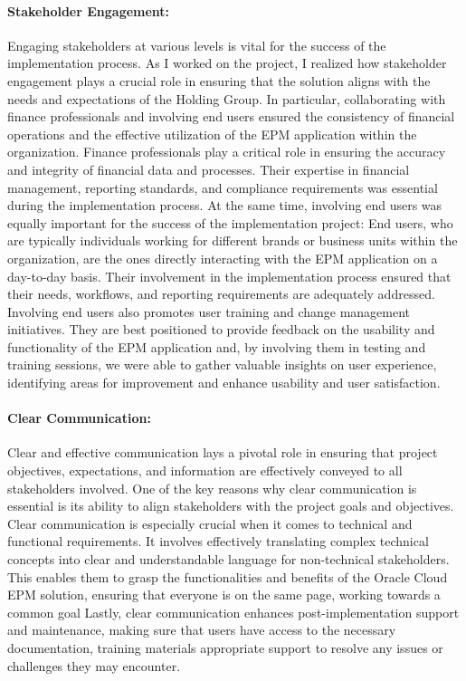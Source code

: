 \documentclass[12pt,a4paper,openright,twoside]{book}
\begin{document}
\paragraph{Stakeholder Engagement:}
Engaging stakeholders at various levels is vital for the success of the implementation process. 
%
As I worked on the project, I realized how stakeholder engagement plays a crucial role in ensuring that the solution aligns with the needs and expectations of the Holding Group.
%
In particular, collaborating with finance professionals and involving end users ensured the consistency of financial operations and the effective utilization of the EPM application within the organization.
%
Finance professionals play a critical role in ensuring the accuracy and integrity of financial data and processes. 
%
Their expertise in financial management, reporting standards, and compliance requirements was essential during the implementation process.
%
At the same time, involving end users was equally important for the success of the implementation project:
%
End users, who are typically individuals working for different brands or business units within the organization, are the ones directly interacting with the EPM application on a day-to-day basis. 
%
Their involvement in the implementation process ensured that their needs, workflows, and reporting requirements are adequately addressed.
%
Involving end users also promotes user training and change management initiatives. 
%
They are best positioned to provide feedback on the usability and functionality of the EPM application and, by involving them in testing and training sessions, we were able to gather valuable insights on user experience, identifying areas for improvement and enhance usability and user satisfaction.

\paragraph{Clear Communication:}
Clear and effective communication lays a pivotal role in ensuring that project objectives, expectations, and information are effectively conveyed to all stakeholders involved.  
%
One of the key reasons why clear communication is essential is its ability to align stakeholders with the project goals and objectives.
%
Clear communication is especially crucial when it comes to technical and functional requirements. 
%
It involves effectively translating complex technical concepts into clear and understandable language for non-technical stakeholders. 
%
This enables them to grasp the functionalities and benefits of the Oracle Cloud EPM solution, ensuring that everyone is on the same page, working towards a common goal
%
Lastly, clear communication enhances post-implementation support and maintenance, making sure that users have access to the necessary documentation, training materials appropriate support to resolve any issues or challenges they may encounter.
\end{document}
